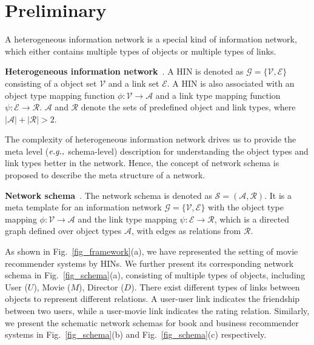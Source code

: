 \section{Preliminary \label{sec-def}}

A heterogeneous information network is a special kind of information network, which either contains multiple types of objects or multiple types of links.
\begin{myDef}
\textbf{Heterogeneous information network}~\cite{sun2012mining}. A HIN is denoted as $\mathcal{G} = \{\mathcal{V}, \mathcal{E}\}$ consisting of a object set $\mathcal{V}$ and a link set $\mathcal{E}$. A HIN is also associated with an object type mapping function $\phi: \mathcal{V} \rightarrow \mathcal{A}$ and a link type mapping function $\psi: \mathcal{E} \rightarrow \mathcal{R}$. $\mathcal{A}$ and $\mathcal{R}$ denote the sets of predefined object and link types, where $|\mathcal{A}| + |\mathcal{R}| > 2$.
\end{myDef}

The complexity of heterogeneous information network drives us to provide the meta level ($\emph{e.g.,}$ schema-level) description for understanding the object types and link types better in the network. Hence, the concept of network schema is proposed to describe the meta structure of a network.
\begin{myDef}
\textbf{Network schema}~\cite{sun2013mining,sun2009ranking}. The network schema is denoted as $\mathcal{S} = (\mathcal{A}, \mathcal{R})$. It is a meta template
for an information network $\mathcal{G} = \{\mathcal{V}, \mathcal{E}\}$ with the object type mapping $\phi: \mathcal{V} \rightarrow \mathcal{A}$ and the link type mapping $\psi: \mathcal{E} \rightarrow \mathcal{R}$, which is a directed graph defined over object types $\mathcal{A}$, with edges as relations from $\mathcal{R}$.
\end{myDef}

\begin{exmp}
As shown in Fig.~\ref{fig_framework}(a), we have represented the setting of movie recommender systems by HINs.
We further present its corresponding network schema in Fig.~\ref{fig_schema}(a), consisting of multiple types of
objects, including User ($U$), Movie ($M$), Director ($D$). There exist different types of links between objects to represent different
relations. A user-user link indicates the friendship between two users, while a user-movie link indicates the rating relation.
Similarly, we present the schematic network schemas for book and business recommender systems in Fig.~\ref{fig_schema}(b) and Fig.~\ref{fig_schema}(c) respectively.
\end{exmp}

